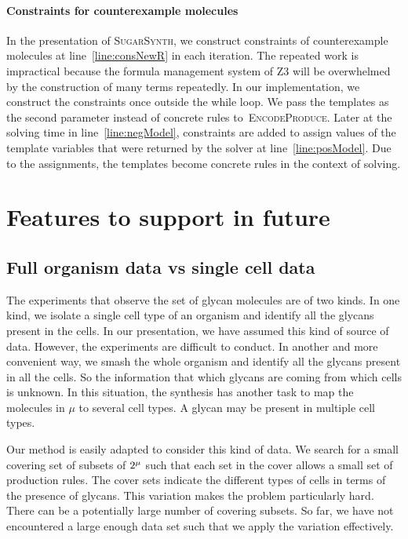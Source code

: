 \documentclass{llncs}
\begin{document}
\paragraph{Constraints for counterexample molecules}
In the presentation of \textsc{SugarSynth}, we construct constraints of counterexample molecules
at line~\ref{line:consNewR} in each iteration.
The repeated work is impractical because the formula management system of Z3 will be overwhelmed by
the construction of many terms repeatedly. In our implementation, we construct the constraints
once outside the while loop.
We pass the templates as the second parameter instead of concrete rules to~\textsc{EncodeProduce}.
Later at the solving time in line~\ref{line:negModel}, constraints are added to assign values
of the template variables that were returned by the solver at line~\ref{line:posModel}.
Due to the assignments, the templates become concrete rules in the context of solving.

\section{Features to support in future}

\subsection{Full organism data vs single cell data}

The experiments that observe the set of glycan molecules are of two kinds. In one kind, we isolate a single cell type of an organism and identify all the glycans present in the cells. In our presentation, we have assumed this kind of source of data. However, the experiments are difficult to conduct.
In another and more convenient way, we smash the whole organism and identify all the glycans present in all the cells.
So the information that which glycans are coming from which
cells is unknown.
In this situation, the synthesis has another task to map the molecules
in $\mu$ to several cell types.
A glycan may be present in multiple cell types.

Our method is easily adapted to consider this kind of data.
We search for a small covering set of subsets of
$2^{\mu}$ such that each set in the cover allows a small
set of production rules.
The cover sets indicate the different types of cells in terms of
the presence of glycans.
This variation makes the problem particularly hard.
There can be a potentially large number of covering subsets.
So far, we have not encountered a large enough data set such that
we apply the variation effectively. 
\end{document}
